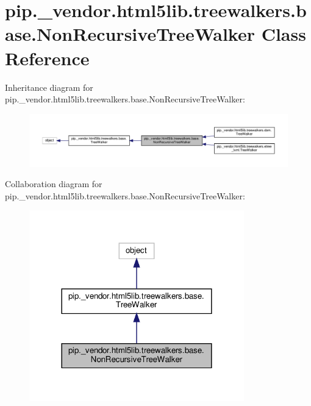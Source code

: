 \hypertarget{classpip_1_1__vendor_1_1html5lib_1_1treewalkers_1_1base_1_1NonRecursiveTreeWalker}{}\section{pip.\+\_\+vendor.\+html5lib.\+treewalkers.\+base.\+Non\+Recursive\+Tree\+Walker Class Reference}
\label{classpip_1_1__vendor_1_1html5lib_1_1treewalkers_1_1base_1_1NonRecursiveTreeWalker}


Inheritance diagram for pip.\+\_\+vendor.\+html5lib.\+treewalkers.\+base.\+Non\+Recursive\+Tree\+Walker\+:
\nopagebreak
\begin{figure}[H]
\begin{center}
\leavevmode
\includegraphics[width=350pt]{classpip_1_1__vendor_1_1html5lib_1_1treewalkers_1_1base_1_1NonRecursiveTreeWalker__inherit__graph}
\end{center}
\end{figure}


Collaboration diagram for pip.\+\_\+vendor.\+html5lib.\+treewalkers.\+base.\+Non\+Recursive\+Tree\+Walker\+:
\nopagebreak
\begin{figure}[H]
\begin{center}
\leavevmode
\includegraphics[width=264pt]{classpip_1_1__vendor_1_1html5lib_1_1treewalkers_1_1base_1_1NonRecursiveTreeWalker__coll__graph}
\end{center}
\end{figure}
